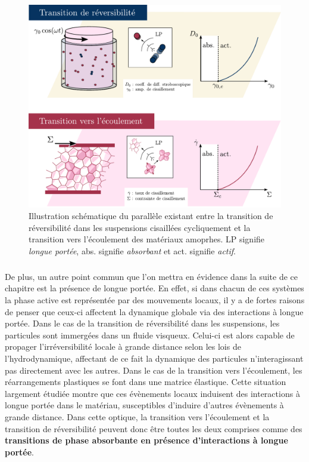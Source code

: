 \begin{figure}[H]
	\centering
	\includegraphics[width=\textwidth]{Chapitre1/Figures/Chapo/Resume.pdf}
	\caption{Illustration schématique du parallèle existant entre la transition de réversibilité dans les suspensions cisaillées cycliquement et la transition vers l'écoulement des matériaux amoprhes. LP signifie \textit{longue portée}, abs. signifie \textit{absorbant} et act. signifie \textit{actif}.}
	\label{fig:banger}
\end{figure}

\subparagraph{}De plus, un autre point commun que l'on mettra en évidence dans la suite de ce chapitre est la présence de longue portée. En effet, si dans chacun de ces systèmes la phase active est représentée par des mouvements locaux, il y a de fortes raisons de penser que ceux-ci affectent la dynamique globale via des interactions à longue portée. Dans le cas de la transition de réversibilité dans les suspensions, les particules sont immergées dans un fluide visqueux. Celui-ci est alors capable de propager l'irréversibilité locale à grande distance selon les lois de l'hydrodynamique, affectant de ce fait la dynamique des particules n'interagissant pas directement avec les autres. Dans le cas de la transition vers l'écoulement, les réarrangements plastiques se font dans une matrice élastique. Cette situation largement étudiée montre que ces évènements locaux induisent des interactions à longue portée dans le matériau, susceptibles d'induire d'autres évènements à grande distance. Dans cette optique, la transition vers l'écoulement et la transition de réversibilité peuvent donc être toutes les deux comprises comme des \textbf{transitions de phase absorbante en présence d'interactions à longue portée}.

